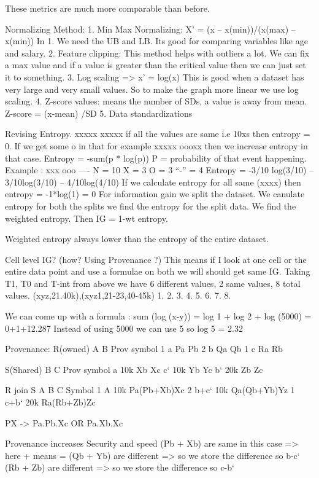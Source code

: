 \documentclass{article}
\begin{document}
These metrics are much more comparable than before. 

Normalizing Method:
1.	Min Max Normalizing:
X’ = (x – x(min))/(x(max) – x(min))
In 1. We need the UB and LB. Its good for comparing variables like age and salary.
2.	Feature clipping: This method helps with outliers a lot. We can fix a max value and if a value is greater than the critical value then we can just set it to something. 
3.	Log scaling => x’ = log(x)
This is good when a dataset has very large and very small values. So to make the graph more linear we use log scaling.
4.	Z-score values: means the number of SDs, a value is away from mean. Z-score = 
(x-mean) /SD
5.	Data standardizations


Revising Entropy.
xxxxx xxxxx  if all the values are same i.e 10xs then entropy = 0.
If we get some o in that for example xxxxx oooxx then we increase entropy in that case. 
Entropy = -sum(p * log(p))
P = probability of that event happening.
Example : xxx ooo ---- 
N = 10
X = 3
O = 3
“-” = 4
Entropy = -3/10 log(3/10) – 3/10log(3/10) – 4/10log(4/10)
If we calculate entropy for all same (xxxx) then entropy = -1*log(1) = 0
For information gain we split the dataset. We canulate entropy for both the splits we find the entropy for the split data. We find the weighted entropy. Then IG = 1-wt entropy.

Weighted entropy always lower than the entropy of the entire dataset.

Cell level IG? (how? Using Provenance ?)
This means if I look at one cell or the entire data point and use a formulae on both we will should get same IG.
Taking T1, T0 and T-int from above we have 6 different values, 2 same values, 8 total values.
(xyz,21.40k),(xyz1,21-23,40-45k)
1.	 2.   3.     4.      5.   6.   7.   8.    

We can come up with a formula : sum (log (x-y)) = log 1 + log 2 + log (5000) = 0+1+12.287
Instead of using 5000 we can use 5 so log 5 = 2.32

Provenance: 
R(owned)
A	B	Prov symbol
1	a	Pa Pb 
2	b	Qa Qb
1	c	Ra Rb

S(Shared)
B	C	Prov symbol
a	10k	Xb Xc
c`	10k	Yb Yc
b`	20k	Zb Zc

R join S
A	B 	C	Symbol
1	A	10k	Pa(Pb+Xb)Xc
2	b+c`	10k	Qa(Qb+Yb)Yz
1	c+b`	20k	Ra(Rb+Zb)Zc

PX -> Pa.Pb.Xc OR Pa.Xb.Xc

Provenance increases Security and speed
(Pb + Xb) are same in this case => here + means =
(Qb + Yb) are different => so we store the difference so b-c`
(Rb + Zb) are different => so we store the difference so c-b`
\end{document}
